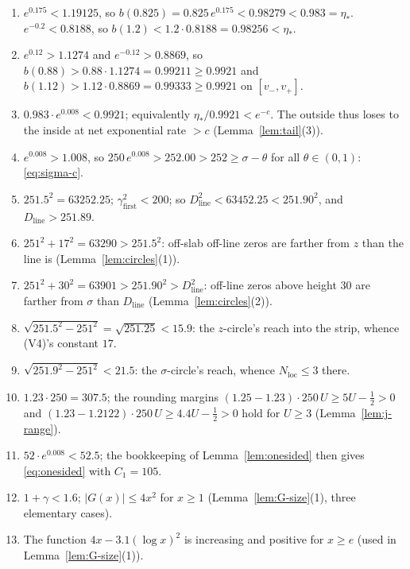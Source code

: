 \documentclass[11pt]{amsart}
\numberwithin{equation}{section}
\newcommand{\Sig}{\sigma}
\newcommand{\Euler}{\gamma}
\begin{document}
\begin{enumerate}
\item $e^{0.175} < 1.19125$, so $b(0.825) = 0.825\,e^{0.175} <
0.98279 < 0.983 = \eta_*$. \quad
$e^{-0.2} < 0.8188$, so $b(1.2) < 1.2 \cdot 0.8188 = 0.98256 <
\eta_*$.
\item $e^{0.12} > 1.1274$ and $e^{-0.12} > 0.8869$, so
$b(0.88) > 0.88 \cdot 1.1274 = 0.99211 \ge 0.9921$ and
$b(1.12) > 1.12 \cdot 0.8869 = 0.99333 \ge 0.9921$ on
$[v_-,v_+]$.
\item $0.983 \cdot e^{0.008} < 0.9921$; equivalently
$\eta_*/0.9921 < e^{-c}$. The outside thus loses to the inside at net
exponential rate $> c$ (Lemma~\ref{lem:tail}(3)).
\item $e^{0.008} > 1.008$, so $250\,e^{0.008} > 252.00 > 252 \ge
\Sig - \theta$ for all $\theta \in (0,1)$: \eqref{eq:sigma-c}.
\item $251.5^2 = 63252.25$; $\gamma_{\mathrm{first}}^2 < 200$; so
$D_{\mathrm{line}}^2 < 63452.25 < 251.90^2$, and
$D_{\mathrm{line}} > 251.89$.
\item $251^2 + 17^2 = 63290 > 251.5^2$: off-slab off-line zeros are
farther from $z$ than the line is
(Lemma~\ref{lem:circles}(1)).
\item $251^2 + 30^2 = 63901 > 251.90^2 > D_{\mathrm{line}}^2$:
off-line zeros above height $30$ are farther from $\Sig$ than
$D_{\mathrm{line}}$ (Lemma~\ref{lem:circles}(2)).
\item $\sqrt{251.5^2 - 251^2} = \sqrt{251.25} < 15.9$: the
$z$-circle's reach into the strip, whence (V4)'s constant $17$.
\item $\sqrt{251.9^2 - 251^2} < 21.5$: the $\Sig$-circle's reach,
whence $N_{\mathrm{loc}} \le 3$ there.
\item $1.23 \cdot 250 = 307.5$; the rounding margins
$(1.25 - 1.23) \cdot 250\,U \ge 5U - \tfrac12 > 0$ and
$(1.23 - 1.2122)\cdot 250\,U \ge 4.4U - \tfrac12 > 0$ hold for
$U \ge 3$ (Lemma~\ref{lem:j-range}).
\item $52 \cdot e^{0.008} < 52.5$; the bookkeeping of
Lemma~\ref{lem:onesided} then gives \eqref{eq:onesided} with
$C_1 = 105$.
\item $1 + \Euler < 1.6$; $|G(x)| \le 4x^2$ for $x \ge 1$
(Lemma~\ref{lem:G-size}(1), three elementary cases).
\item The function $4x - 3.1(\log x)^2$ is increasing and positive
for $x \ge e$ (used in Lemma~\ref{lem:G-size}(1)).
\end{enumerate}
\end{document}
